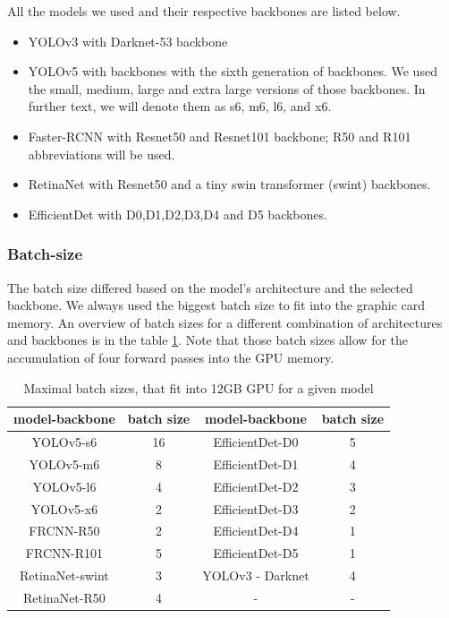 All the models we used and their respective backbones are listed below.
\begin{itemize}
    \item YOLOv3 with Darknet-53 backbone
    \item YOLOv5 with backbones with the sixth generation of backbones. We used the small, medium, large and extra large versions of those backbones. In further text, we will denote them as s6, m6, l6, and x6.
    \item Faster-RCNN with Resnet50 and Resnet101 backbone; R50 and R101 abbreviations will be used.
    \item RetinaNet with Resnet50 and a tiny swin transformer (swint) backbones.
    \item EfficientDet with D0,D1,D2,D3,D4 and D5 backbones.
\end{itemize}

\subsubsection{Batch-size}
The batch size differed based on the model's architecture and the selected backbone. We always used the biggest batch size to fit into the graphic card memory. An overview of batch sizes for a different combination of architectures and backbones is in the table \ref{tab:batch_sizes}. Note that those batch sizes allow for the accumulation of four forward passes into the GPU memory.

\begin{table}
    \centering
    \begin{tabular}{|c|c|c|c|}
        \hline
        model-backbone  & batch size & model-backbone   & batch size \\ \hline
        YOLOv5-s6       & 16         & EfficientDet-D0  & 5          \\ \hline
        YOLOv5-m6       & 8          & EfficientDet-D1  & 4          \\ \hline
        YOLOv5-l6       & 4          & EfficientDet-D2  & 3          \\ \hline
        YOLOv5-x6       & 2          & EfficientDet-D3  & 2          \\ \hline
        FRCNN-R50       & 2          & EfficientDet-D4  & 1          \\ \hline
        FRCNN-R101      & 5          & EfficientDet-D5  & 1          \\ \hline
        RetinaNet-swint & 3          & YOLOv3 - Darknet & 4          \\ \hline
        RetinaNet-R50   & 4          & -                & -          \\ \hline
    \end{tabular}
    \caption{Maximal batch sizes, that fit into 12GB GPU for a given model}
    \label{tab:batch_sizes}
\end{table}



